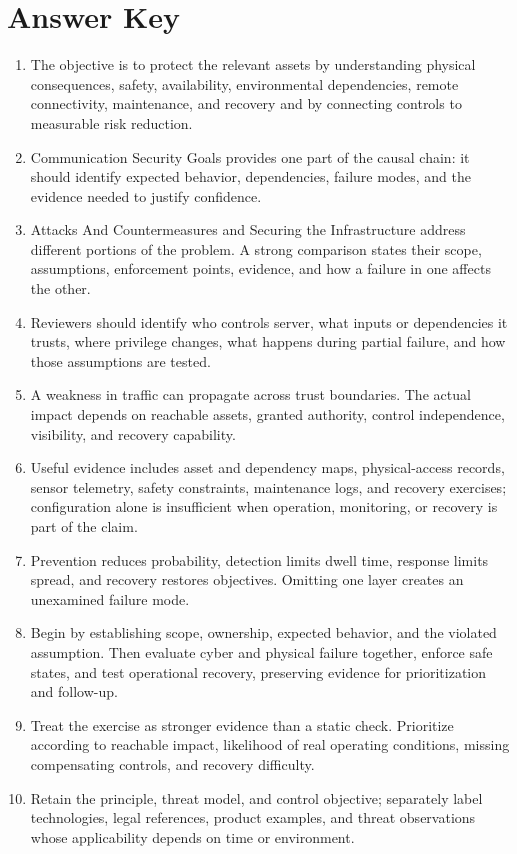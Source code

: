 \documentclass[11pt]{article}
\begin{document}
\section*{Answer Key}
\begin{enumerate}
\item The objective is to protect the relevant assets by understanding physical consequences, safety, availability, environmental dependencies, remote connectivity, maintenance, and recovery and by connecting controls to measurable risk reduction.
\item Communication Security Goals provides one part of the causal chain: it should identify expected behavior, dependencies, failure modes, and the evidence needed to justify confidence.
\item Attacks And Countermeasures and Securing the Infrastructure address different portions of the problem. A strong comparison states their scope, assumptions, enforcement points, evidence, and how a failure in one affects the other.
\item Reviewers should identify who controls server, what inputs or dependencies it trusts, where privilege changes, what happens during partial failure, and how those assumptions are tested.
\item A weakness in traffic can propagate across trust boundaries. The actual impact depends on reachable assets, granted authority, control independence, visibility, and recovery capability.
\item Useful evidence includes asset and dependency maps, physical-access records, sensor telemetry, safety constraints, maintenance logs, and recovery exercises; configuration alone is insufficient when operation, monitoring, or recovery is part of the claim.
\item Prevention reduces probability, detection limits dwell time, response limits spread, and recovery restores objectives. Omitting one layer creates an unexamined failure mode.
\item Begin by establishing scope, ownership, expected behavior, and the violated assumption. Then evaluate cyber and physical failure together, enforce safe states, and test operational recovery, preserving evidence for prioritization and follow-up.
\item Treat the exercise as stronger evidence than a static check. Prioritize according to reachable impact, likelihood of real operating conditions, missing compensating controls, and recovery difficulty.
\item Retain the principle, threat model, and control objective; separately label technologies, legal references, product examples, and threat observations whose applicability depends on time or environment.
\end{enumerate}
\end{document}
